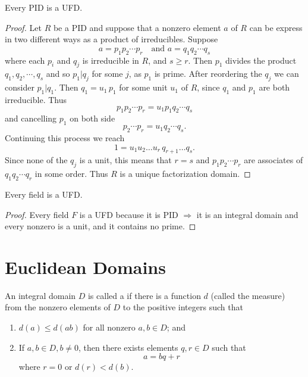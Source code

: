 \begin{theorem}
    Every PID is a UFD.
\end{theorem}
\begin{proof}
    Let $R$ be a PID and suppose that a nonzero element $a$ of $R$ can be express in two different ways 
    as a product of irreducibles. Suppose
    \[
        a = p_1 p_2 \cdots p_r \quad \text{and } a = q_1 q_2 \cdots q_s 
    \]
    where each $p_i$ and $q_j$ is irreducible in $R$, and $s \geq r$. Then $p_1$ divides the 
    product $q_1, q_2, \cdots, q_s $ and so $p_1 | q_j$ for some $j$, as $p_1$ is prime. 
    After reordering the $q_j$ we can consider $p_1|q_1$. Then $q_1 = u_1\, p_1$ for some unit $u_1$ of $R$,
    since $q_1$ and $p_1$ are both irreducible. Thus
    \[
        p_1 p_2 \cdots p_r = u_1 p_1 q_2 \cdots q_s
    \]
    and cancelling $p_1$ on both side
    \[
        p_2 \cdots p_r = u_1 q_2 \cdots q_s.
    \]
    Continuing this process we reach
    \[
        1 = u_1 u_2 \ldots u_r\, q_{r+1} \ldots q_s.
    \]
    Since none of the $q_j$ is a unit, this means that $r=s$ and $p_1 p_2 \cdots p_r$ are associates of 
    $q_1 q_2 \cdots q_r$ in some order. Thus $R$ is a unique factorization domain.
\end{proof}

\begin{theorem}
    Every field is a UFD.
\end{theorem}
\begin{proof}
    Every field $F$ is a UFD because it is PID $\Rightarrow$ it is an integral domain and every nonzero 
    is a unit, and it contains no prime.
\end{proof}

\section{Euclidean Domains}

\begin{definition}
    An integral domain $D$ is called a  if there is a function $d$ 
    (called the measure) from the nonzero elements of $D$ to the positive integers such that 

    \begin{enumerate}
        \item $d(a) \leq d(ab)$ for all nonzero $a,b \in D$; and 
        \item If $a,b \in D, b \neq 0$, then there exists elements $q, r \in D$ such that 
        \[
            a = bq + r
        \]
        where $r = 0$ or $d(r) < d(b)$.
    \end{enumerate}
\end{definition}

